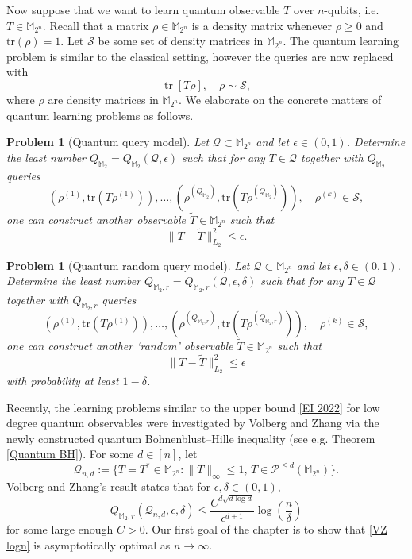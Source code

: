 \documentclass{amsbook}
\newtheorem{problem}[theorem]{Problem}
\theoremstyle{definition}
\theoremstyle{remark}
\numberwithin{section}{chapter}
\numberwithin{equation}{chapter}
\newcommand{\M}{\mathbb{M}}
\newcommand{\1}{\mathbf{1}}
\newcommand{\tr}{\mathrm{tr}}
\begin{document}
Now suppose that we want to learn quantum observable $T$ over $n$-qubits, i.e. $T \in \M_{2^n}$. Recall that a matrix $\rho\in \M_{2^n}$ is a density matrix whenever $\rho\geq0$  and $\mathrm{tr}(\rho)=1$. Let $\mathcal{S}$ be some set of density matrices in $\M_{2^n}$. The quantum learning problem is similar to the classical setting, however the queries are now replaced with
\[
\operatorname{tr}[T\rho], \quad \rho \sim \mathcal{S},
\]
where $\rho$ are density matrices in $\M_{2^n}$.    We elaborate on the concrete matters of quantum learning problems as follows. 
\begin{problem}[Quantum query model] Let $\mathcal{Q}\subset \M_{2^n}$ and let $\epsilon\in (0,1)$.  Determine  the least number $Q_{\M_2}=Q_{\M_2}(\mathcal{Q},\epsilon)$ such that for any $T\in \mathcal{Q}$ together with $Q_{\M_2}$ queries
$$(\rho^{(1)}, \tr(T\rho^{(1)})), \dots, (\rho^{(Q_{\M_2})}, \tr(T\rho^{(Q_{\M_2})})), \quad \rho^{(k)}\in \mathcal{S},$$
 one can construct another  observable $\widetilde{T}\in \M_{2^n}$ such that 
$$\|T-\widetilde{T}\|_{L_2}^2 \leq \epsilon.$$
\end{problem}

\begin{problem}[Quantum random query model]
 Let $\mathcal{Q}\subset \M_{2^n}$ and let $\epsilon,\delta\in (0,1)$.  Determine  the least number $Q_{\M_2,r}=Q_{\M_2,r}(\mathcal{Q},\epsilon,\delta)$ such that for any $T\in \mathcal{Q}$ together with $Q_{\M_2,r}$ queries
$$(\rho^{(1)}, \tr(T\rho^{(1)})), \dots, (\rho^{(Q_{\M_2,r})}, \tr(T\rho^{(Q_{\M_2,r})})), \quad \rho^{(k)}\in \mathcal{S},$$
 one can construct another `random' observable $\widetilde{T}\in \M_{2^n}$ such that 
$$\|T-\widetilde{T}\|_{L_2}^2 \leq \epsilon$$
with probability at least $1-\delta$. 
\end{problem}

Recently, the learning problems similar to the upper bound \eqref{EI 2022} for low degree
quantum observables were investigated by Volberg and Zhang \cite{VZ2024} via the newly constructed quantum Bohnenblust--Hille inequality (see e.g. Theorem \ref{Quantum BH}). For some $d\in [n]$, let
\[
\mathcal Q_{n,d}
:=
\{T=T^*\in \M_{2^n}: \|T\|_\infty\leq 1,\, T\in \mathcal{P}^{\leq d}(\M_{2^n})\}. 
\]
Volberg and Zhang's result states that for $\epsilon,\delta\in (0,1)$, 
\begin{equation}\label{VZ logn}
Q_{\M_2,r}(\mathcal{Q}_{n,d},\epsilon,\delta)\leq \frac{C^{d\sqrt{d\log d}}}{\epsilon^{d+1}}\log(\frac{n}{\delta})
\end{equation}
for some large enough $C>0$. Our first goal of the chapter is to show that \eqref{VZ logn} is asymptotically optimal as $n\to \infty$. 
\end{document}
